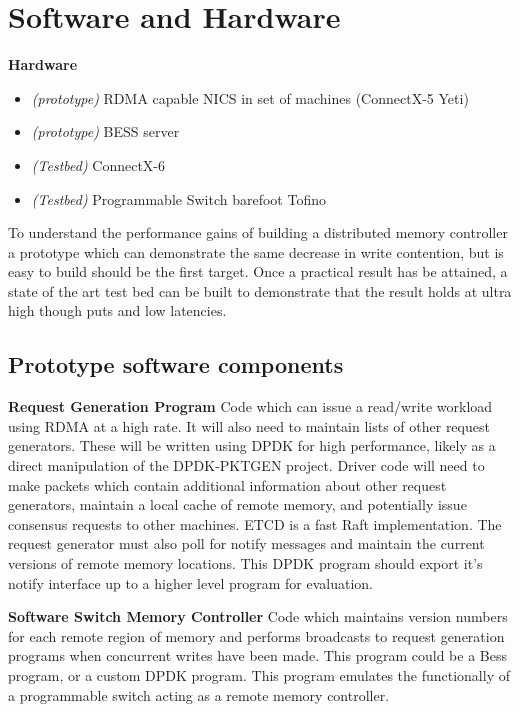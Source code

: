 \section{Software and Hardware}

\noindent\textbf{Hardware}
\begin{itemize}
    \item \emph{(prototype)} RDMA capable NICS in set of machines
        (ConnectX-5 Yeti)
    \item \emph{(prototype)} BESS server
    \item \emph{(Testbed)} ConnectX-6
    \item \emph{(Testbed)} Programmable Switch barefoot Tofino
\end{itemize}

To understand the performance gains of building a distributed memory
controller a prototype which can demonstrate the same decrease in
write contention, but is easy to build should be the first target.
Once a practical result has be attained, a state of the art test bed
can be built to demonstrate that the result holds at ultra high
though puts and low latencies.

\subsection{Prototype software components}

\textbf{Request Generation Program} Code which can issue a read/write
workload using RDMA at a high rate. It will also need to maintain
lists of other request generators. These will be written using DPDK
for high performance, likely as a direct manipulation of the
DPDK-PKTGEN project. Driver code will need to make packets which
contain additional information about other request generators,
maintain a local cache of remote memory, and potentially issue
consensus requests to other machines. ETCD is a fast Raft
implementation. The request generator must also poll for notify
messages and maintain the current versions of remote memory locations.
This DPDK program should export it's notify interface up to a higher
level program for evaluation.

\textbf{Software Switch Memory Controller} Code which maintains
version numbers for each remote region of memory and performs
broadcasts to request generation programs when concurrent writes have
been made. This program could be a Bess program, or a custom DPDK
program. This program emulates the functionally of a programmable
switch acting as a remote memory controller.

